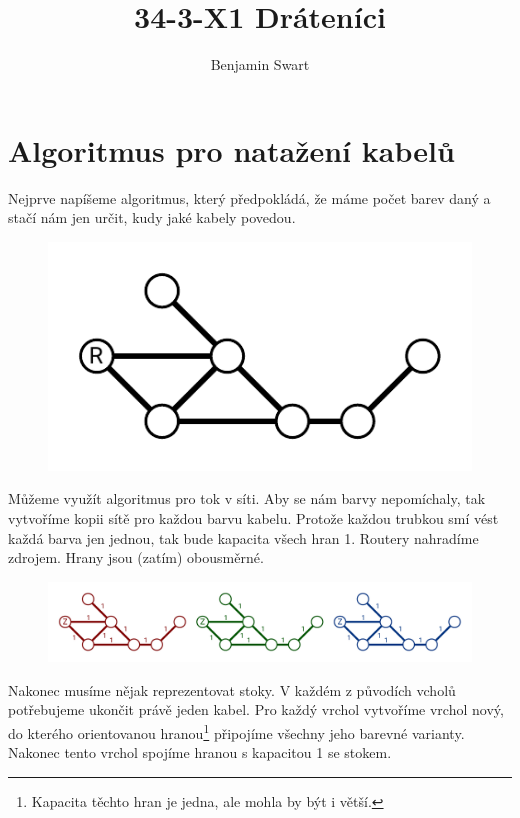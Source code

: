 \documentclass{article}
\title{34-3-X1 Dráteníci}
\author{Benjamin Swart}
\begin{document}
\maketitle

\section{Algoritmus pro natažení kabelů}
\label{section:base}

Nejprve napíšeme algoritmus, který předpokládá, že máme počet barev daný a stačí nám jen určit, kudy jaké kabely povedou.

\begin{figure}[H]
    \centering
    \includegraphics[scale=0.7]{initial.pdf}
\end{figure}

Můžeme využít algoritmus pro tok v síti. Aby se nám barvy nepomíchaly, tak vytvoříme kopii sítě pro každou barvu kabelu. Protože každou trubkou smí vést každá barva jen jednou, tak bude kapacita všech hran 1. Routery nahradíme zdrojem. Hrany jsou (zatím) obousměrné.

\begin{figure}[H]
    \centering
    \includegraphics[scale=0.7]{colored.pdf}
\end{figure}

Nakonec musíme nějak reprezentovat stoky. V každém z původích vcholů potřebujeme ukončit právě jeden kabel. Pro každý vrchol vytvoříme vrchol nový, do kterého orientovanou hranou\footnote{Kapacita těchto hran je jedna, ale mohla by být i větší.} připojíme všechny jeho barevné varianty. Nakonec tento vrchol spojíme hranou s kapacitou 1 se stokem.
\end{document}

